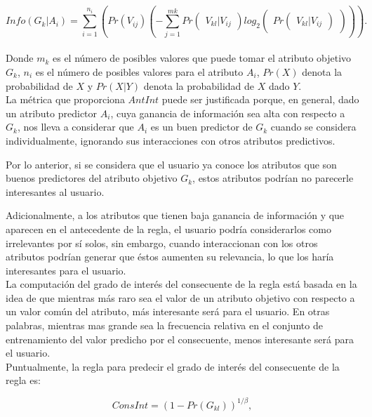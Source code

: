 \begin{equation} \label{eq:4}
Info(\left. G_k \right| A_i)=\sum\limits_{i=1}^{n_i}\left( Pr(V_{ij})\left(-\sum\limits_{j=1}^{mk} Pr\begin{pmatrix}V_{kl}|V_{ij}\end{pmatrix} log_2 \begin{pmatrix}Pr\begin{pmatrix}V_{kl}|V_{ij}\end{pmatrix}\end{pmatrix}\right)  \right).
\end{equation}
\\
Donde $m_k$ es el número de posibles valores que puede tomar el atributo objetivo $G_k$, $n_i$ es el número de posibles valores para el atributo $A_i$, $Pr(X)$ denota la probabilidad de $X$ y $Pr(X|Y)$ denota la probabilidad de $X$ dado $Y$.
\\
La métrica que proporciona $AntInt$ puede ser justificada porque, en general, dado un atributo predictor $A_i$, cuya ganancia de información sea alta con respecto a $G_k$, nos lleva a considerar que $A_i$ es un buen predictor de $G_k$ cuando se considera individualmente, ignorando sus interacciones con otros atributos predictivos.

Por lo anterior, si se considera que el usuario ya conoce los atributos que son buenos predictores del atributo objetivo $G_k$, estos atributos podrían no parecerle interesantes al usuario.

Adicionalmente, a los atributos que tienen baja ganancia de información y que aparecen en el antecedente de la regla, el usuario podría considerarlos como irrelevantes por sí solos, sin embargo, cuando interaccionan con los otros atributos podrían generar que éstos aumenten su relevancia, lo que los haría interesantes para el usuario.
\\
La computación del grado de interés del consecuente de la regla está basada en la idea de que mientras más raro sea el valor de un atributo objetivo con respecto a un valor común del atributo, más interesante será para el usuario. En otras palabras, mientras mas grande sea la frecuencia relativa en el conjunto de entrenamiento del valor predicho por el consecuente, menos interesante será para el usuario.
\\
Puntualmente, la regla para predecir el grado de interés del consecuente de la regla es:

\begin{equation} \label{eq:5}
ConsInt= (1-Pr(G_{kl}))^{1/\beta},
\end{equation}

